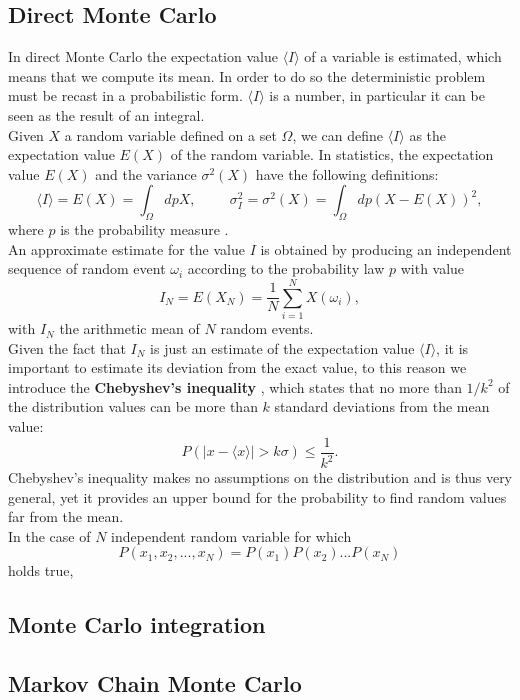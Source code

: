 \subsection{Direct Monte Carlo}
In direct Monte Carlo the expectation value $\langle I\rangle$ of a variable is estimated, which means that we compute its mean. In 
order to do so the deterministic problem must be recast in a probabilistic form. $\langle I\rangle$ is a number, in particular it can be seen as 
the result of an integral.\\
Given $X$ a random variable defined on a set $\Omega$, we can define $\langle I\rangle$ as the expectation value $E(X)$ of the random variable.
In statistics, the expectation value $E(X)$ and the variance $\sigma^2(X)$ have the following definitions:
\begin{equation}
\langle I\rangle=E(X)=\int_\Omega dp X,\hspace{1cm}\sigma^2_I=\sigma^2(X)=\int_\Omega dp (X-E(X))^2,
\end{equation}
where $p$ is the probability measure \cite{fehske2007computational}.\\
An approximate estimate for the value $I$ is obtained by producing an independent sequence of random event $\omega_i$ according to the probability 
law $p$ with value
\begin{equation}
    I_N=E(X_N)=\frac{1}{N}\sum_{i=1}^NX(\omega_i),
\end{equation}
with $I_N$ the arithmetic mean of $N$ random events.\\
Given the fact that $I_N$ is just an estimate of the expectation value $\langle I \rangle$, it is important to estimate its deviation 
from the exact value, to this reason we introduce the \textbf{Chebyshev's inequality} \cite{becca2017quantum}, which states that no more 
than $1/k^2$ of the distribution values can be more than $k$ standard deviations from the mean value:
\begin{equation}
    P(|x-\langle x\rangle|> k\sigma)\le\frac{1}{k^2}.
\end{equation}
Chebyshev's inequality makes no assumptions on the distribution and is thus very general, yet it provides an upper bound for the probability 
to find random values far from the mean.\\
In the case of $N$ independent random variable for which 
\begin{equation}
    P(x_1,x_2,...,x_N)=P(x_1)P(x_2)...P(x_N)
\end{equation}
holds true, 
\subsection{Monte Carlo integration}
\lipsum[2]

\subsection{Markov Chain Monte Carlo}
\lipsum[3]
\subsection{}
